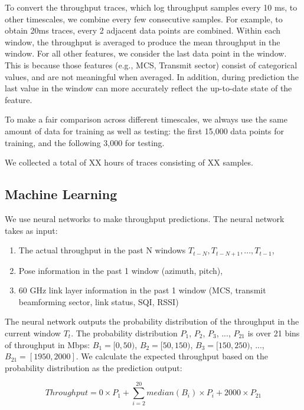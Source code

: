 \documentclass[sigconf,anonymous]{acmart}
\begin{document}
To convert the throughput traces, which log throughput samples every 10 ms, to other timescales, we combine every few consecutive samples. For example, to obtain 20ms traces, every 2 adjacent data points are combined. Within each window, the throughput is averaged to produce the mean throughput in the window. For all other features, we consider the last data point in the window. This is because those features (e.g., MCS, Transmit sector) consist of categorical values, and are not meaningful when averaged. In addition, during prediction the last value in the window can more accurately reflect the up-to-date state of the feature.

To make a fair comparison across different timescales, we always use the same amount of data for training as well as testing: the first 15,000 data points for training, and the following 3,000 for testing.

We collected a total of XX hours of traces consisting of XX samples.

\subsection{Machine Learning}
\label{subsection: Machine Learning}

We use neural networks to make throughput predictions. The neural network takes as input:
\begin{enumerate}
    \item The actual throughput in the past N windows $T_{t-N}, T_{t-N+1}, ..., T_{t-1}$,
    \item Pose information in the past 1 window (azimuth, pitch),
    \item 60 GHz link layer information in the past 1 window (MCS, transmit beamforming sector, link status, SQI, RSSI)
\end{enumerate}

The neural network outputs the probability distribution of the throughput in the current window $T_{t}$. The probability distribution $P_{1}$, $P_{2}$, $P_{3}$, ..., $P_{21}$ is over 21 bins of throughput in Mbps: $B_{1}=[0,50)$, $B_{2}=[50, 150)$, $B_{3}=[150, 250)$, ..., $B_{21}=[1950, 2000]$. We calculate the expected throughput based on the probability distribution as the prediction output:

\begin{equation}
Throughput = 0 \times P_{1} + \sum_{i=2}^{20} median(B_{i}) \times P_{i} + 2000 \times P_{21}
\end{equation}
\end{document}
